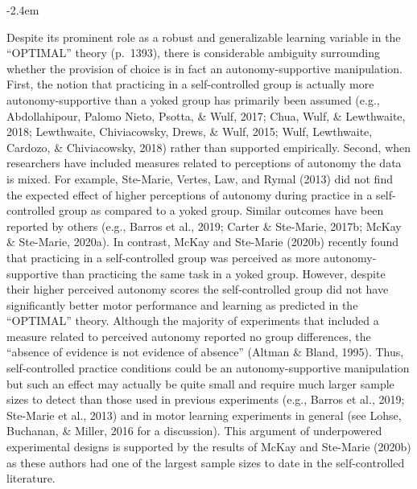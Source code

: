 \documentclass[final]{article}
\renewenvironment{quote}{\begin{fquote}\advance\leftmargini -2.4em\begin{oldquote}}{\end{oldquote}\end{fquote}}
\newenvironment{fquote}
  {\def\FrameCommand{
	\fboxsep=0.6em %
	\fcolorbox{black}{white}}%
    \MakeFramed {\advance\hsize-2\width \FrameRestore}
    \begin{minipage}{\linewidth}
  }
  {\end{minipage}\endMakeFramed}
\begin{document}
\begin{quote}
Despite its prominent role as a robust and generalizable learning variable in the ``OPTIMAL'' theory (p.~1393), there is considerable ambiguity surrounding whether the provision of choice is in fact an autonomy-supportive manipulation. First, the notion that practicing in a self-controlled group is actually more autonomy-supportive than a yoked group has primarily been assumed (e.g., Abdollahipour, Palomo Nieto, Psotta, \& Wulf, 2017; Chua, Wulf, \& Lewthwaite, 2018; Lewthwaite, Chiviacowsky, Drews, \& Wulf, 2015; Wulf, Lewthwaite, Cardozo, \& Chiviacowsky, 2018) rather than supported empirically. Second, when researchers have included measures related to perceptions of autonomy the data is mixed. For example, Ste-Marie, Vertes, Law, and Rymal (2013) did not find the expected effect of higher perceptions of autonomy during practice in a self-controlled group as compared to a yoked group. Similar outcomes have been reported by others (e.g., Barros et al., 2019; Carter \& Ste-Marie, 2017b; McKay \& Ste-Marie, 2020a). In contrast, McKay and Ste-Marie (2020b) recently found that practicing in a self-controlled group was perceived as more autonomy-supportive than practicing the same task in a yoked group. However, despite their higher perceived autonomy scores the self-controlled group did not have significantly better motor performance and learning as predicted in the ``OPTIMAL'' theory. Although the majority of experiments that included a measure related to perceived autonomy reported no group differences, the ``absence of evidence is not evidence of absence'' (Altman \& Bland, 1995). Thus, self-controlled practice conditions could be an autonomy-supportive manipulation but such an effect may actually be quite small and require much larger sample sizes to detect than those used in previous experiments (e.g., Barros et al., 2019; Ste-Marie et al., 2013) and in motor learning experiments in general (see Lohse, Buchanan, \& Miller, 2016 for a discussion). This argument of underpowered experimental designs is supported by the results of McKay and Ste-Marie (2020b) as these authors had one of the largest sample sizes to date in the self-controlled literature.
\end{quote}

\end{document}
